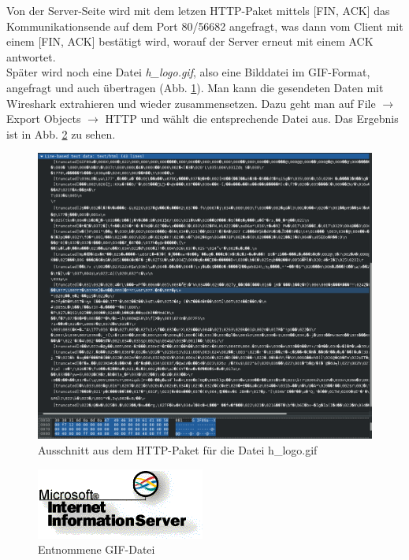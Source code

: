 \documentclass[11pt, a4paper]{article}
\begin{document}
Von der Server-Seite wird mit dem letzen HTTP-Paket mittels [FIN, ACK] das Kommunikationsende auf dem Port 80/56682 angefragt, was dann vom Client mit einem [FIN, ACK] bestätigt wird, worauf der Server erneut mit einem ACK antwortet.\\

Später wird noch eine Datei \emph{h\_logo.gif}, also eine Bilddatei im GIF-Format, angefragt und auch übertragen (Abb. \ref{gif_data}). Man kann die gesendeten Daten mit Wireshark extrahieren und wieder zusammensetzen. Dazu geht man auf File $\rightarrow$ Export Objects $\rightarrow$ HTTP und wählt die entsprechende Datei aus. Das Ergebnis ist in Abb. \ref{hlogo} zu sehen.

\begin{figure}[H]
  \centering
  \includegraphics[width=\textwidth]{graphics/versuch/3_4/wireshark/gif_data}
  \caption{Ausschnitt aus dem HTTP-Paket für die Datei h\_logo.gif}\label{gif_data}
\end{figure}

\begin{figure}[H]
  \centering
  \includegraphics[width=\textwidth]{graphics/versuch/3_4/wireshark/h_logo}
  \caption{Entnommene GIF-Datei}\label{hlogo}
\end{figure}
\end{document}
